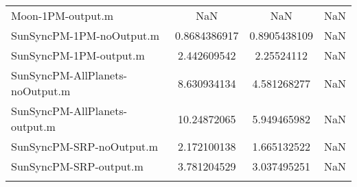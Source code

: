 \begin{table}[htbp!]
\begin{tabular}{lccc}
         Moon-1PM-output.m & NaN & NaN & NaN \\
         SunSyncPM-1PM-noOutput.m & 0.8684386917 & 0.8905438109 & NaN \\
         SunSyncPM-1PM-output.m & 2.442609542 & 2.25524112 & NaN \\
         SunSyncPM-AllPlanets-noOutput.m & 8.630934134 & 4.581268277 & NaN \\
         SunSyncPM-AllPlanets-output.m & 10.24872065 & 5.949465982 & NaN \\
         SunSyncPM-SRP-noOutput.m & 2.172100138 & 1.665132522 & NaN \\
         SunSyncPM-SRP-output.m & 3.781204529 & 3.037495251 & NaN \\
      \hline\hline
      \label{Table: Performance2-2} 
\end{tabular}
\end{table}
